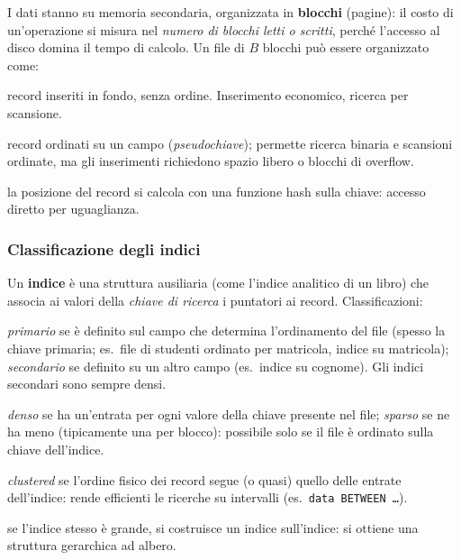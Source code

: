 \documentclass[a4paper,12pt]{article}
\begin{document}
I dati stanno su memoria secondaria, organizzata in \textbf{blocchi} (pagine):
il costo di un'operazione si misura nel \emph{numero di blocchi letti o
scritti}, perché l'accesso al disco domina il tempo di calcolo. Un file di
$B$ blocchi può essere organizzato come:
\begin{description}[style=nextline]
  \item[Heap (seriale)] record inseriti in fondo, senza ordine. Inserimento
    economico, ricerca per scansione.
  \item[Sequenziale ordinato] record ordinati su un campo (\emph{pseudochiave});
    permette ricerca binaria e scansioni ordinate, ma gli inserimenti richiedono
    spazio libero o blocchi di overflow.
  \item[Hash] la posizione del record si calcola con una funzione hash sulla
    chiave: accesso diretto per uguaglianza.
\end{description}

\subsubsection{Classificazione degli indici}

Un \textbf{indice} è una struttura ausiliaria (come l'indice analitico di un
libro) che associa ai valori della \emph{chiave di ricerca} i puntatori ai
record. Classificazioni:
\begin{description}[style=nextline]
  \item[Primario / secondario] \emph{primario} se è definito sul campo che
    determina l'ordinamento del file (spesso la chiave primaria; es.\ file
    di studenti ordinato per matricola, indice su matricola); \emph{secondario}
    se definito su un altro campo (es.\ indice su cognome). Gli indici
    secondari sono sempre densi.
  \item[Denso / sparso] \emph{denso} se ha un'entrata per ogni valore della
    chiave presente nel file; \emph{sparso} se ne ha meno (tipicamente una per
    blocco): possibile solo se il file è ordinato sulla chiave dell'indice.
  \item[Clustered / unclustered] \emph{clustered} se l'ordine fisico dei record
    segue (o quasi) quello delle entrate dell'indice: rende efficienti le
    ricerche su intervalli (es.\ \texttt{data BETWEEN \ldots}).
  \item[Monolivello / multilivello] se l'indice stesso è grande, si costruisce
    un indice sull'indice: si ottiene una struttura gerarchica ad albero.
\end{description}
\end{document}
